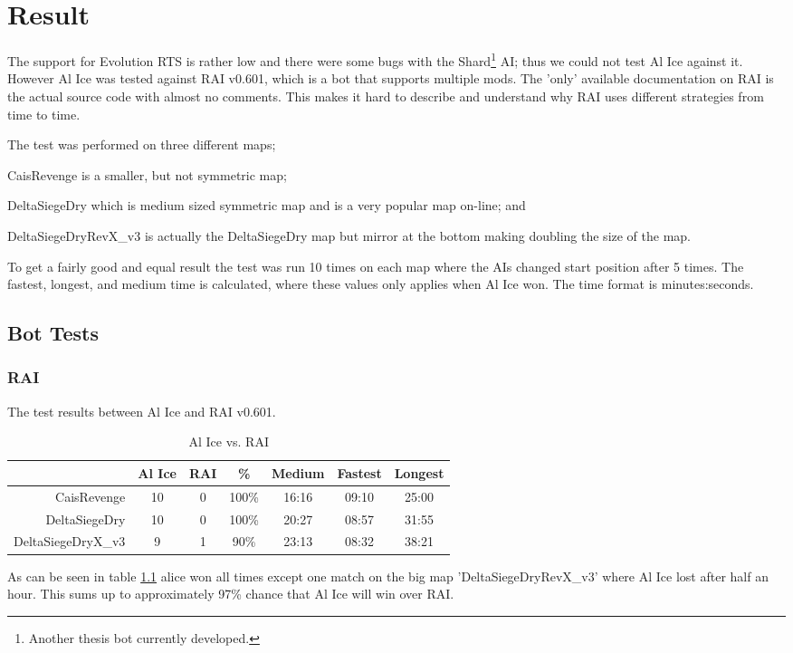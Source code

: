 \chapter[Result]{Result} 
The support for Evolution RTS is rather low and there were some bugs with the
Shard\footnote{Another thesis bot currently developed.} AI; thus we could not
test Al Ice against it. However Al Ice was tested against RAI v0.601, which is a bot that supports
multiple mods. The 'only' available documentation on RAI is the actual source code\cite{RAI10} with
almost no comments. This makes it hard to describe and understand why RAI uses different strategies
from time to time.

The test was performed on three different maps;
\begin{inparaenum}[1)]
\item CaisRevenge is a smaller, but not symmetric map;
\item DeltaSiegeDry which is medium sized symmetric map and is a very popular map on-line; and
\item DeltaSiegeDryRevX\_v3 is actually the DeltaSiegeDry map but mirror at the bottom making
doubling the size of the map.
\end{inparaenum}
To get a fairly good and equal result the test was run 10 times on each map where the AIs changed
start position after 5 times. The fastest, longest, and medium time is calculated, where these
values only applies when Al Ice won. The time format is minutes:seconds.

\section{Bot Tests}
\subsection{RAI} 
The test results between Al Ice and RAI v0.601.
\begin{table}[htb]
\caption{Al Ice vs. RAI}
\label{tab:alice_vs_rai}
\begin{center}
\begin{tabular}{r|c|c|c|c|c|c}
\hline
& Al Ice & RAI & \% & Medium & Fastest & Longest \\ \hline
CaisRevenge & 10 & 0 & 100\% & 16:16 & 09:10 & 25:00 \\ \hline
DeltaSiegeDry & 10 & 0 & 100\% & 20:27 & 08:57 & 31:55 \\ \hline 
DeltaSiegeDryX\_v3 & 9 & 1 & 90\% & 23:13 & 08:32 & 38:21 \\ \hline 
\end{tabular}
\end{center}
\end{table}
As can be seen in table \ref{tab:alice_vs_rai} alice won all times except
one match on the big map 'DeltaSiegeDryRevX\_v3' where Al Ice lost after half an
hour. This sums up to approximately 97\% chance that Al Ice will win over RAI.

